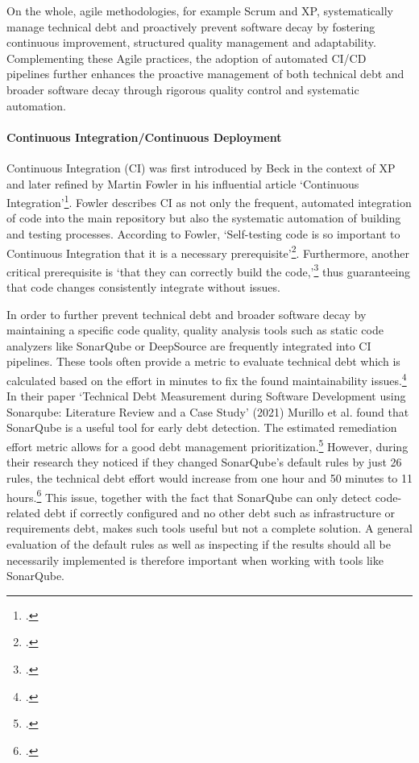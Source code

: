 On the whole, agile methodologies, for example Scrum and \ac{XP}, systematically manage technical debt and proactively prevent software decay by fostering continuous improvement, structured quality management and adaptability.
Complementing these Agile practices, the adoption of automated \ac{CI/CD} pipelines further enhances the proactive management of both technical debt
and broader software decay through rigorous quality control and systematic automation.

\paragraph{Continuous Integration/Continuous Deployment}
Continuous Integration (CI) was first introduced by Beck in the context of \ac{XP} and later refined by Martin Fowler in his influential article `Continuous Integration'\footcite[no page number.]{fowlerContinuousIntegration2006}.
Fowler describes \ac{CI} as not only the frequent, automated integration of code into the main repository but also the systematic automation of building and testing processes.
According to Fowler, `Self-testing code is so important to Continuous Integration that it is a necessary prerequisite'\footcite[no page number]{fowlerContinuousIntegration2006}.
Furthermore, another critical prerequisite is `that they can correctly build the code,'\footcite[no page number]{fowlerContinuousIntegration2006} thus guaranteeing that code changes consistently
integrate without issues.

In order to further prevent technical debt and broader software decay by maintaining a specific code quality, quality analysis tools such as static code analyzers like SonarQube or DeepSource are frequently integrated into
\ac{CI} pipelines. These tools often provide a metric to evaluate technical debt which is calculated based on the effort in minutes to fix the found maintainability issues.\footcite[no page number]{sonarqubeUnderstandingMeasuresMetrics2025}
In their paper `Technical Debt Measurement during Software Development using Sonarqube: Literature Review and a Case Study' (2021)
Murillo et al. found that SonarQube is a useful tool for early debt detection. The estimated remediation effort metric allows for a good debt management prioritization.\footcite[5]{murilloTechnicalDebtMeasurement2021}
However, during their research they noticed if they changed SonarQube's default rules by just 26 rules, the technical debt effort would increase from
one hour and 50 minutes to 11 hours.\footcite[4]{murilloTechnicalDebtMeasurement2021} This issue, together with the fact that SonarQube can only detect code-related debt if correctly configured and no other debt such as
infrastructure or requirements debt, makes such tools useful but not a complete solution. A general evaluation of the default rules as well as inspecting if the results should all be necessarily implemented is therefore important when working with tools like SonarQube.

